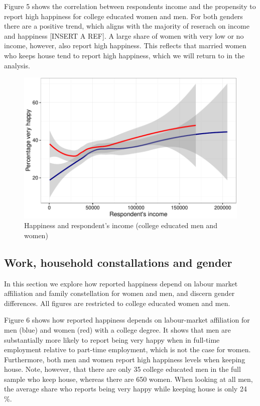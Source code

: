 \documentclass[]{article}
\begin{document}
Figure 5 shows the correlation between respondents income and the
propensity to report high happiness for college educated women and men.
For both genders there are a positive trend, which aligns with the
majority of reserach on income and happiness {[}INSERT A REF{]}. A large
share of women with very low or no income, however, also report high
happiness. This reflects that married women who keeps house tend to
report high happiness, which we will return to in the analysis.

\begin{figure}[htbp]
\centering
\includegraphics{Final_Project_P-P_analysis_Unger_files/figure-latex/unnamed-chunk-7-1.pdf}
\caption{Happiness and respondent's income (college educated men and
women)}
\end{figure}

\subsection{Work, household constallations and
gender}\label{work-household-constallations-and-gender}

In this section we explore how reported happiness depend on labour
market affiliation and family constellation for women and men, and
discern gender differences. All figures are restricted to college
educated women and men.

Figure 6 shows how reported happiness depends on labour-market
affiliation for men (blue) and women (red) with a college degree. It
shows that men are substantially more likely to report being very happy
when in full-time employment relative to part-time employment, which is
not the case for women. Furthermore, both men and women report high
happiness levels when keeping house. Note, however, that there are only
35 college educated men in the full sample who keep house, whereas there
are 650 women. When looking at all men, the average share who reports
being very happy while keeping house is only 24 \%.
\end{document}
